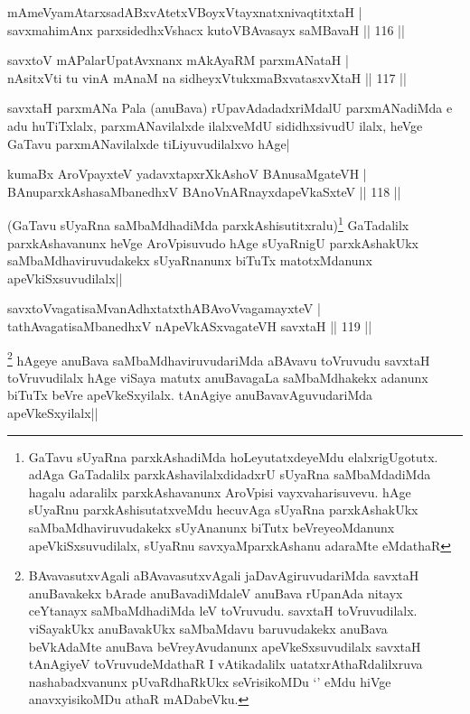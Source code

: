 \begin{shl}
mAmeVyamAtarxsadABxvAtetxVBoyxV\s tayxnatxnivaqtitxtaH |\\
savxmahimAnx parxsidedhxVshacx kutoV\s BAvasayx saMBavaH \hfill || 116 ||
\end{shl}

\begin{shl}
savxtoV mAPalarUpatAvxnanx mAkAyaRM parxmANataH |\\
nAsitxVti tu vinA mAnaM na sidheyxVtukxmaBxvatasxvXtaH \hfill || 117 ||
\end{shl}

\begin{artha}%
savxtaH parxmANa Pala (anuBava) rUpavAdadadxriMdalU parxmANadiMda e adu huTiTxlalx, parxmANavilalxde ilalxveMdU sididhxsivudU ilalx, heVge GaTavu parxmANavilalxde tiLiyuvudilalxvo hAge|
\end{artha}


\begin{shl}
kumaBx AroVpayxteV yadavxtapxrXkAshoV BAnusaMgateVH |\\
BAnuparxkAshasaMbanedhxV BAnoVnARnayxdapeVkaSxteV \hfill || 118 ||
\end{shl}

\begin{artha}
(GaTavu sUyaRna saMbaMdhadiMda parxkAshisutitxralu)\footnote[1]{GaTavu sUyaRna parxkAshadiMda hoLeyutatxdeyeMdu elalxrigUgotutx. adAga GaTadalilx parxkAshavilalxdidadxrU sUyaRna saMbaMdadiMda hagalu adaralilx parxkAshavanunx AroVpisi vayxvaharisuvevu. hAge sUyaRnu parxkAshisutatxveMdu hecuvAga sUyaRna parxkAshakUkx saMbaMdhaviruvudakekx sUyAnanunx biTutx beVreyeoMdanunx apeVkiSxsuvudilalx, sUyaRnu savxyaMparxkAshanu adaraMte eMdathaR} GaTadalilx parxkAshavanunx heVge AroVpisuvudo hAge sUyaRnigU parxkAshakUkx saMbaMdhaviruvudakekx sUyaRnanunx biTuTx matotxMdanunx apeVkiSxsuvudilalx||
\end{artha}

\begin{shl}
savxtoV\s vagatisaMvanAdhxtatxthA\s BAvoV\s vagamayxteV |\\
tathA\s vagatisaMbanedhxV nApeVkASx\s vagateVH savxtaH \hfill || 119 ||
\end{shl}

\begin{artha}
\footnote[2]{BAvavasutxvAgali aBAvavasutxvAgali jaDavAgiruvudariMda savxtaH anuBavakekx bArade anuBavadiMdaleV anuBava rUpanAda nitayx ceYtanayx saMbaMdhadiMda leV toVruvudu. savxtaH toVruvudilalx. viSayakUkx anuBavakUkx saMbaMdavu baruvudakekx anuBava beVkAdaMte anuBava beVreyAvudanunx apeVkeSxsuvudilalx savxtaH tAnAgiyeV toVruvudeMdathaR I vAtikadalilx uatatxrAthaRdalilxruva nashabadxvanunx pUvaRdhaRkUkx seVrisikoMDu `\stext ' eMdu hiVge anavxyisikoMDu athaR mADabeVku.} hAgeye anuBava saMbaMdhaviruvudariMda aBAvavu toVruvudu savxtaH toVruvudilalx hAge viSaya matutx anuBavagaLa saMbaMdhakekx adanunx biTuTx beVre apeVkeSxyilalx. tAnAgiye anuBavavAguvudariMda apeVkeSxyilalx||
\end{artha}

